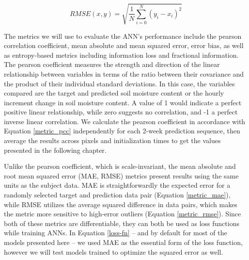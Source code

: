 \begin{equation}
    \label{metric_rmse}
    RMSE(x,y) = \sqrt{\frac{1}{N}\sum_{i=0}^{N}\left(y_i-x_i\right)^2}
\end{equation}

The metrics we will use to evaluate the ANN's performance include the pearson correlation coefficient, mean absolute and mean squared error, error bias, as well as entropy-based metrics including information loss and fractional information. The pearson coefficient measures the strength and direction of the linear relationship between variables in terms of the ratio between their covariance and the product of their individual standard deviations. In this case, the variables compared are the target and predicted soil moisture content or the hourly increment change in soil moisture content. A value of 1 would indicate a perfect positive linear relationship, while zero suggests no correlation, and -1 a perfect inverse linear correlation. We calculate the pearson coefficient in accordance with Equation \ref{metric_pcc} independently for each 2-week prediction sequence, then average the results across pixels and initialization times to get the values presented in the following chapter.

Unlike the pearson coefficient, which is scale-invariant, the mean absolute and root mean squared error (MAE, RMSE) metrics present results using the same units as the subject data. MAE is straightforwardly the expected error for a randomly selected target and prediction data pair (Equation \ref{metric_mae}), while RMSE utilizes the average squared difference in data pairs, which makes the metric more sensitive to high-error outliers (Equation \ref{metric_rmse}). Since both of these metrics are differentiable, they can both be used as loss functions while training ANNs. In Equation \ref{loss-fn} -- and by default for most of the models presented here -- we used MAE as the essential form of the loss function, however we will test models trained to optimize the squared error as well.

